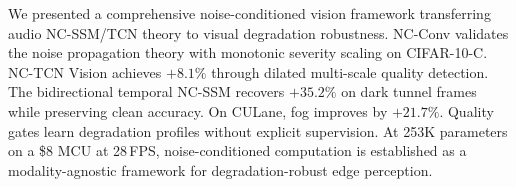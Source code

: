 \documentclass[journal]{IEEEtran}
\begin{document}
We presented a comprehensive noise-conditioned vision framework transferring audio NC-SSM/TCN theory to visual degradation robustness.
NC-Conv validates the noise propagation theory with monotonic severity scaling on CIFAR-10-C.
NC-TCN Vision achieves $+8.1\%$ through dilated multi-scale quality detection.
The bidirectional temporal NC-SSM recovers $+35.2\%$ on dark tunnel frames while preserving clean accuracy.
On CULane, fog improves by $+21.7\%$.
Quality gates learn degradation profiles without explicit supervision.
At 253K parameters on a \$8 MCU at 28\,FPS, noise-conditioned computation is established as a modality-agnostic framework for degradation-robust edge perception.




\end{document}
